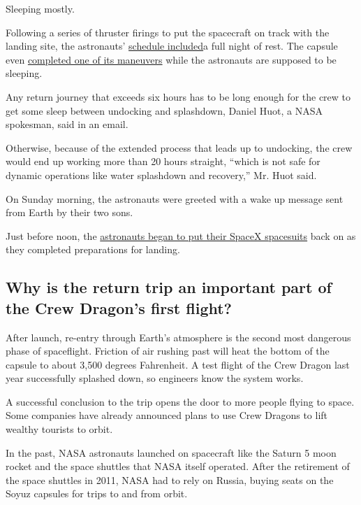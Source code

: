 Sleeping mostly.

Following a series of thruster firings to put the spacecraft on track
with the landing site, the astronauts'
\href{https://twitter.com/NASA/status/1289245570565992449}{schedule
included}a full night of rest. The capsule even
\href{https://twitter.com/Commercial_Crew/status/1289744080214212609}{completed
one of its maneuvers} while the astronauts are supposed to be sleeping.

Any return journey that exceeds six hours has to be long enough for the
crew to get some sleep between undocking and splashdown, Daniel Huot, a
NASA spokesman, said in an email.

Otherwise, because of the extended process that leads up to undocking,
the crew would end up working more than 20 hours straight, ``which is
not safe for dynamic operations like water splashdown and recovery,''
Mr. Huot said.

On Sunday morning, the astronauts were greeted with a wake up message
sent from Earth by their two sons.

Just before noon, the
\href{https://www.nytimes.com/2020/05/27/fashion/SpaceX-Dragon-Suits.html}{astronauts
began to put their SpaceX spacesuits} back on as they completed
preparations for landing.

\hypertarget{why-is-the-return-trip-an-important-part-of-the-crew-dragons-first-flight}{%
\subsection{Why is the return trip an important part of the Crew
Dragon's first
flight?}\label{why-is-the-return-trip-an-important-part-of-the-crew-dragons-first-flight}}

After launch, re-entry through Earth's atmosphere is the second most
dangerous phase of spaceflight. Friction of air rushing past will heat
the bottom of the capsule to about 3,500 degrees Fahrenheit. A test
flight of the Crew Dragon last year successfully splashed down, so
engineers know the system works.

A successful conclusion to the trip opens the door to more people flying
to space. Some companies have already announced plans to use Crew
Dragons to lift wealthy tourists to orbit.

In the past, NASA astronauts launched on spacecraft like the Saturn 5
moon rocket and the space shuttles that NASA itself operated. After the
retirement of the space shuttles in 2011, NASA had to rely on Russia,
buying seats on the Soyuz capsules for trips to and from orbit.

